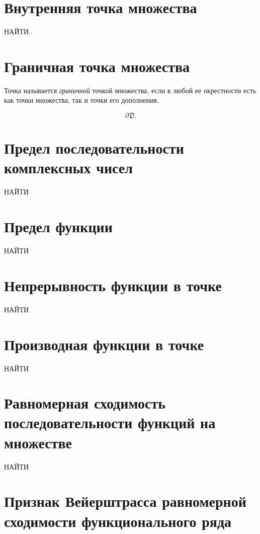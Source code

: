 \section{Внутренняя точка множества}

 {\huge НАЙТИ}

\section{Граничная точка множества}

\begin{definition}
	Точка называется \emph{граничной} точкой множества, если в любой ее окрестности есть как точки множества, так и точки его дополнения.
	\begin{notation}
		\[
			\partial \mathfrak{D}.
		\]
	\end{notation}
\end{definition}

\section{Предел последовательности комплексных чисел}

 {\huge НАЙТИ}

\section{Предел функции}

 {\huge НАЙТИ}

\section{Непрерывность функции в точке}

 {\huge НАЙТИ}

\section{Производная функции в точке}

 {\huge НАЙТИ}

\section{Равномерная сходимость последовательности функций на множестве}

 {\huge НАЙТИ}

\section{Признак Вейерштрасса равномерной сходимости функционального ряда}

